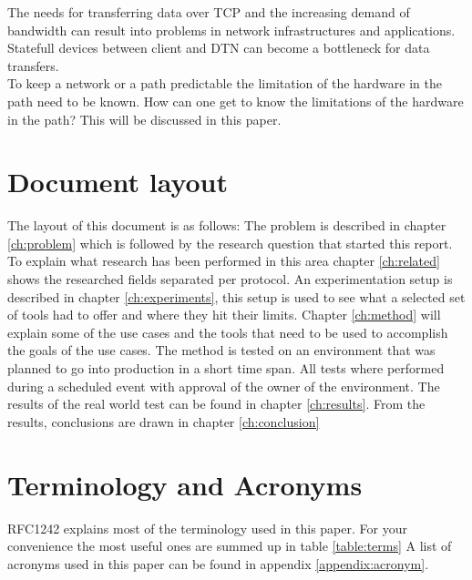The needs for transferring data over TCP and the increasing demand of bandwidth can result into problems in network infrastructures and applications. 
Statefull devices between client and DTN can become a bottleneck for data transfers.\\ 
To keep a network or a path predictable the limitation of the hardware in the path need to be known.
How can one get to know the limitations of the hardware in the path?
This will be discussed in this paper.  

\section{Document layout}\label{sec:layout}

The layout of this document is as follows: The problem is described in chapter \ref{ch:problem} which is followed by the research question that started this report. To explain what research has been performed in this area chapter \ref{ch:related} shows the researched fields separated per protocol. An experimentation setup is described in chapter \ref{ch:experiments}, this setup is used to see what a selected set of tools had to offer and where they hit their limits.
Chapter \ref{ch:method} will explain some of the use cases and the tools that need to be used to accomplish the goals of the use cases. The method is tested on an environment that was planned to go into production in a short time span. All tests where performed during a scheduled event with approval of the owner of the environment. The results of the real world test can be found in chapter \ref{ch:results}. 
From the results, conclusions are drawn in chapter \ref{ch:conclusion} 

\section{Terminology and Acronyms}\label{sec:terminology}
RFC1242 \cite{rfc1242} explains most of the terminology used in this paper. For your convenience the most useful ones are summed up in table \ref{table:terms}
A list of acronyms used in this paper can be found in appendix \ref{appendix:acronym}.

